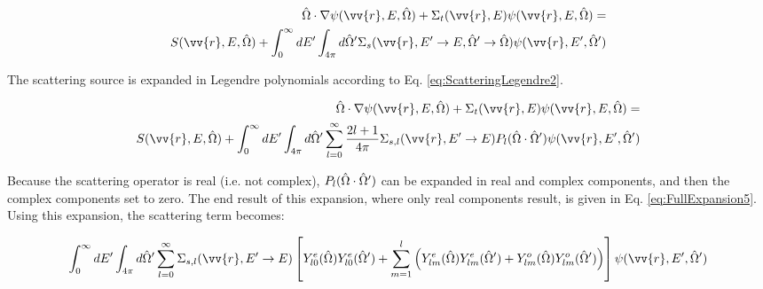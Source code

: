 \begin{equation*}
\begin{aligned}
 \hO  \cdot\nabla\psi(\vv{r}, E, \hO  ) + 
 \Sigma_t(\vv{r},E)\psi(\vv{r}, E, \hO  ) = \\
S(\vv{r}, E, \hO  ) + \int_{0}^{\infty}dE' \int_{4\pi}^{ } d\hO  ' \Sigma_s(\vv{r}, E'\rightarrow E, \hO  '\rightarrow\hO  )\psi(\vv{r}, E', \hO  ')\\
\end{aligned}
\end{equation*}

The scattering source is expanded in Legendre polynomials according to Eq. \eqref{eq:ScatteringLegendre2}.

\begin{equation}
\begin{aligned}
 \hO  \cdot\nabla\psi(\vv{r}, E, \hO  ) + 
 \Sigma_t(\vv{r},E)\psi(\vv{r}, E, \hO  ) = \\
S(\vv{r}, E, \hO  ) + \int_{0}^{\infty}dE' \int_{4\pi}^{ } d\hO  ' \sum_{l=0}^{\infty}\frac{2l+1}{4\pi}\Sigma_{s,l}(\vv{r}, E'\rightarrow E)P_l(\hO  \cdot\hO  ')\psi(\vv{r}, E', \hO  ')\\
\end{aligned}
\end{equation}

Because the scattering operator is real (i.e. not complex), \(P_l(\hat{\Omega}  \cdot\hat{\Omega}  ')\) can be expanded in real and complex components, and then the complex components set to zero. The end result of this expansion, where only real components result, is given in Eq. \eqref{eq:FullExpansion5}. Using this expansion, the scattering term becomes:

\begin{equation}
\label{eq:ScatteringSourceSN}
\begin{aligned}
\int_{0}^{\infty}dE' \int_{4\pi}^{ } d\hO  ' \sum_{l=0}^{\infty}\Sigma_{s,l}(\vv{r}, E'\rightarrow E)\left\lbrack Y_{l0}^e(\hO  )Y_{l0}^e(\hO  ')+\sum_{m=1}^{l}\left(Y_{lm}^e(\hO  )Y_{lm}^{e}(\hO  ')+Y_{lm}^o(\hO  )Y_{lm}^{o}(\hO  ')\right)\right\rbrack\psi(\vv{r}, E', \hO  ')\\
\end{aligned}
\end{equation}

